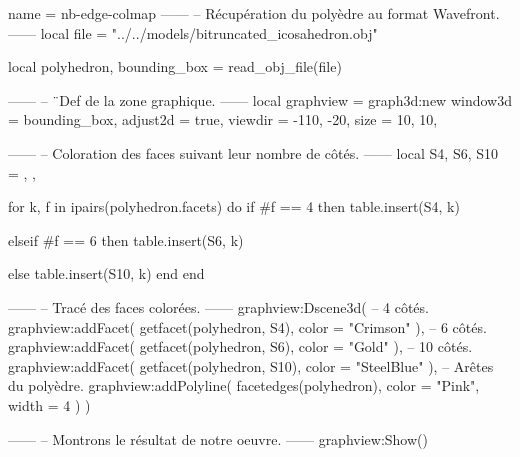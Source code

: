 \documentclass{standalone}
\begin{document}
\begin{luadraw}{name = nb-edge-colmap}
------
-- Récupération du polyèdre au format Wavefront.
------
local file = "../../models/bitruncated_icosahedron.obj"

local polyhedron, bounding_box = read_obj_file(file)

------
-- ¨Def de la zone graphique.
------
local graphview = graph3d:new{
  window3d = bounding_box,
  adjust2d = true,
  viewdir  = {-110, -20},
  size     = {10, 10},
}

------
-- Coloration des faces suivant leur nombre de côtés.
------
local S4, S6, S10 = {}, {}, {}

for k, f in ipairs(polyhedron.facets) do
  if #f == 4 then
    table.insert(S4, k)

  elseif #f == 6 then
    table.insert(S6, k)

  else
    table.insert(S10, k)
  end
end

------
-- Tracé des faces colorées.
------
graphview:Dscene3d(
-- 4 côtés.
  graphview:addFacet(
    getfacet(polyhedron, S4),
    {color = "Crimson"}
  ),
-- 6 côtés.
  graphview:addFacet(
    getfacet(polyhedron, S6),
    {color = "Gold"}
  ),
-- 10 côtés.
  graphview:addFacet(
    getfacet(polyhedron, S10),
    {color = "SteelBlue"}
  ),
-- Arêtes du polyèdre.
  graphview:addPolyline(
    facetedges(polyhedron),
    {
      color = "Pink",
      width = 4
    }
  )
)

------
-- Montrons le résultat de notre oeuvre.
------
graphview:Show()
\end{luadraw}
\end{document}

